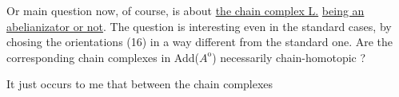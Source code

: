 Or main question now, of course, is about \uline{the chain complex L.}
\uline{being an abelianizator or not}. The question is interesting even in the
standard cases, by chosing the orientations (16) in a way different
from the standard one. Are the corresponding chain complexes in
Add($A^{\mathrm{o}}$) necessarily chain-homotopic ?

It just occurs to me that  between the chain complexes



